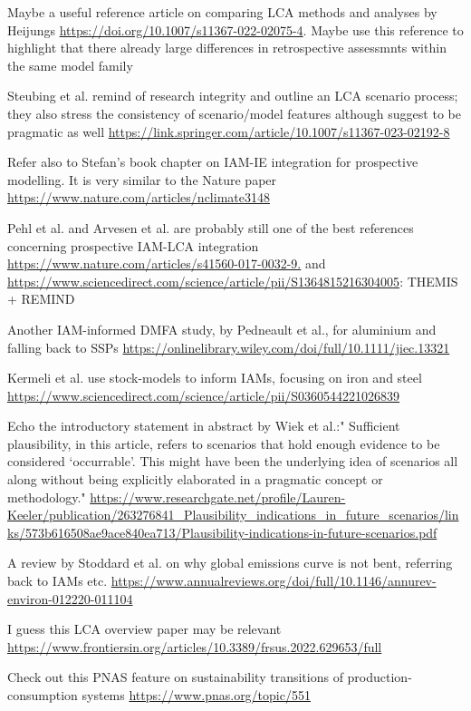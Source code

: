 \documentclass{article}
\begin{document}
Maybe a useful reference article on comparing LCA methods and analyses by Heijungs \url{https://doi.org/10.1007/s11367-022-02075-4}. Maybe use this reference to highlight that there already large differences in retrospective assessmnts within the same model family

Steubing et al. remind of research integrity and outline an LCA scenario process; they also stress the consistency of scenario/model features although suggest to be pragmatic as well \url{https://link.springer.com/article/10.1007/s11367-023-02192-8}

Refer also to Stefan's book chapter on IAM-IE integration for prospective modelling. It is very similar to the Nature paper \url{https://www.nature.com/articles/nclimate3148}

Pehl et al. and Arvesen et al. are probably still one of the best references concerning prospective IAM-LCA integration \url{https://www.nature.com/articles/s41560-017-0032-9.} and \url{https://www.sciencedirect.com/science/article/pii/S1364815216304005}: THEMIS + REMIND

Another IAM-informed DMFA study, by Pedneault et al., for aluminium and falling back to SSPs \url{https://onlinelibrary.wiley.com/doi/full/10.1111/jiec.13321}

Kermeli et al. use stock-models to inform IAMs, focusing on iron and steel \url{https://www.sciencedirect.com/science/article/pii/S0360544221026839}

Echo the introductory statement in abstract by Wiek et al.:" Sufficient plausibility, in this article, refers to scenarios that hold enough evidence to be considered ‘occurrable’. This might have been the underlying idea of scenarios all along without being explicitly elaborated in a pragmatic concept or methodology." \url{https://www.researchgate.net/profile/Lauren-Keeler/publication/263276841_Plausibility_indications_in_future_scenarios/links/573b616508ae9ace840ea713/Plausibility-indications-in-future-scenarios.pdf}

A review by Stoddard et al. on why global emissions curve is not bent, referring back to IAMs etc. \url{https://www.annualreviews.org/doi/full/10.1146/annurev-environ-012220-011104} 

I guess this LCA overview paper may be relevant \url{https://www.frontiersin.org/articles/10.3389/frsus.2022.629653/full}

Check out this PNAS feature on sustainability transitions of production-consumption systems \url{https://www.pnas.org/topic/551}
\end{document}
